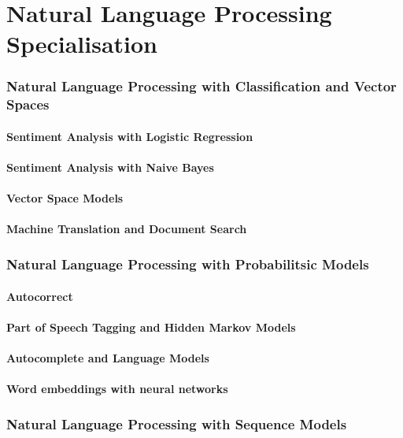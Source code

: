 \part{Natural Language Processing Specialisation}

\section{Natural Language Processing with Classification and Vector Spaces}
\subsection{Sentiment Analysis with Logistic Regression}
\subsection{Sentiment Analysis with Naive Bayes}
\subsection{Vector Space Models}
\subsection{Machine Translation and Document Search}

\section{Natural Language Processing with Probabilitsic Models}
\subsection{Autocorrect}
\subsection{Part of Speech Tagging and Hidden Markov Models}
\subsection{Autocomplete and Language Models}
\subsection{Word embeddings with neural networks}

\section{Natural Language Processing with Sequence Models}
